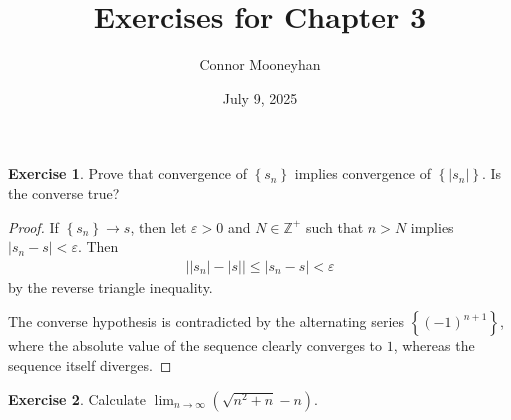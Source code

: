 \documentclass[12pt]{article}
\title{Exercises for Chapter 3}
\author{Connor Mooneyhan}
\date{July 9, 2025}
\theoremstyle{definition}
\newtheorem{ex}{Exercise}
\begin{document}
\maketitle

\begin{ex}
  Prove that convergence of $\left\lbrace s_n \right\rbrace$ implies convergence of $\left\lbrace \left| s_n \right| \right\rbrace$.
  Is the converse true?
\end{ex}
\begin{proof}
  If $\left\lbrace s_n \right\rbrace \to s$, then let $\varepsilon > 0$ and $N \in \mathbb{Z}^+$ such that $n > N$ implies $|s_n - s| < \varepsilon$.
  Then \begin{align*}
    \big| |s_n| - |s| \big| \leq |s_n - s| < \varepsilon
  \end{align*}
  by the reverse triangle inequality.

  The converse hypothesis is contradicted by the alternating series $\left\lbrace (-1)^{n+1} \right\rbrace$, where the absolute value of the sequence clearly converges to $1$, whereas the sequence itself diverges.
\end{proof}

\begin{ex}
  Calculate $\lim_{n \to \infty} (\sqrt{n^2 + n} - n)$.
\end{ex}
\end{document}
